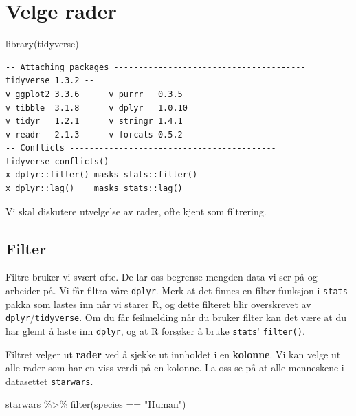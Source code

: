 \documentclass[
  letterpaper,
  DIV=11,
  numbers=noendperiod]{scrreprt}
\newenvironment{Shaded}{\begin{snugshade}}{\end{snugshade}}
\newcommand{\FunctionTok}[1]{\textcolor[rgb]{0.28,0.35,0.67}{#1}}
\newcommand{\NormalTok}[1]{\textcolor[rgb]{0.00,0.23,0.31}{#1}}
\newcommand{\SpecialCharTok}[1]{\textcolor[rgb]{0.37,0.37,0.37}{#1}}
\newcommand{\StringTok}[1]{\textcolor[rgb]{0.13,0.47,0.30}{#1}}
\begin{document}

\hypertarget{sec-filter}{%
\chapter{Velge rader}\label{sec-filter}}

\begin{Shaded}
\begin{Highlighting}[]
\FunctionTok{library}\NormalTok{(tidyverse)}
\end{Highlighting}
\end{Shaded}

\begin{verbatim}
-- Attaching packages --------------------------------------- tidyverse 1.3.2 --
v ggplot2 3.3.6      v purrr   0.3.5 
v tibble  3.1.8      v dplyr   1.0.10
v tidyr   1.2.1      v stringr 1.4.1 
v readr   2.1.3      v forcats 0.5.2 
-- Conflicts ------------------------------------------ tidyverse_conflicts() --
x dplyr::filter() masks stats::filter()
x dplyr::lag()    masks stats::lag()
\end{verbatim}

Vi skal diskutere utvelgelse av rader, ofte kjent som filtrering.

\hypertarget{filter}{%
\section{Filter}\label{filter}}

Filtre bruker vi svært ofte. De lar oss begrense mengden data vi ser på
og arbeider på. Vi får filtra våre \texttt{dplyr}. Merk at det finnes en
filter-funksjon i \texttt{stats}-pakka som lastes inn når vi starer R,
og dette filteret blir overskrevet av \texttt{dplyr}/\texttt{tidyverse}.
Om du får feilmelding når du bruker filter kan det være at du har glemt
å laste inn \texttt{dplyr}, og at R forsøker å bruke \texttt{stats}'
\texttt{filter()}.

Filtret velger ut \textbf{rader} ved å sjekke ut innholdet i en
\textbf{kolonne}. Vi kan velge ut alle rader som har en viss verdi på en
kolonne. La oss se på at alle menneskene i datasettet \texttt{starwars}.

\begin{Shaded}
\begin{Highlighting}[]
\NormalTok{starwars }\SpecialCharTok{\%\textgreater{}\%} \FunctionTok{filter}\NormalTok{(species }\SpecialCharTok{==} \StringTok{"Human"}\NormalTok{)}
\end{Highlighting}
\end{Shaded}
\end{document}

